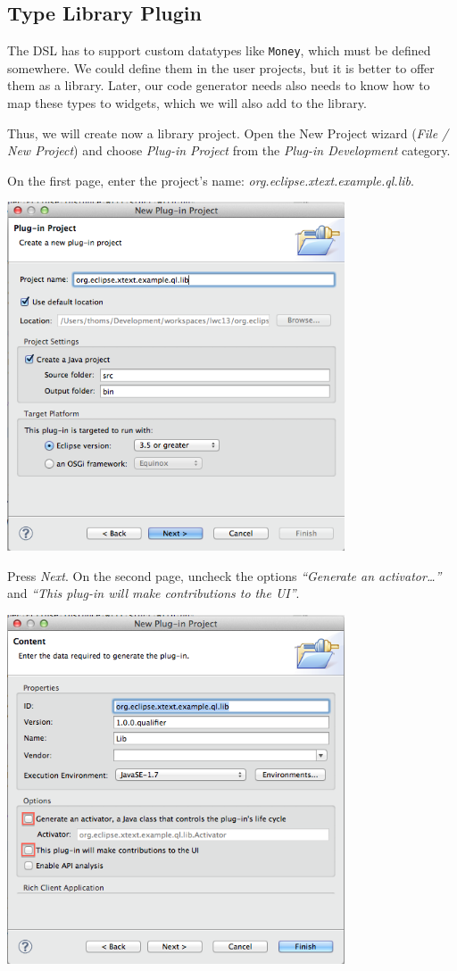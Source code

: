\subsection{Type Library Plugin}

The DSL has to support custom datatypes like \texttt{Money}, which must be
defined somewhere. We could define them in the user projects, but it is better
to offer them as a library. Later, our code generator needs also needs to know
how to map these types to widgets, which we will also add to the library.

Thus, we will create now a library project. Open the New Project wizard (\emph{File /
New Project}) and choose \emph{Plug-in Project} from the \emph{Plug-in Development} category.

On the first page, enter the project's name: \emph{org.eclipse.xtext.example.ql.lib}.

\includegraphics[width=10cm]{./images/chapter01/NewPluginProject_01.png}

Press \emph{Next}. On the second page, uncheck the options \emph{``Generate an
activator\ldots''} and \emph{``This plug-in will make contributions to the UI''}.

\includegraphics[width=10cm]{./images/chapter01/NewPluginProject_02.png}

